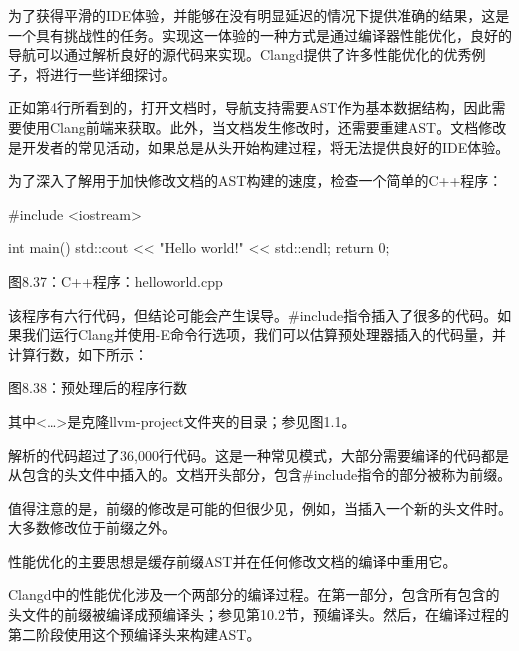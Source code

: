 为了获得平滑的IDE体验，并能够在没有明显延迟的情况下提供准确的结果，这是一个具有挑战性的任务。实现这一体验的一种方式是通过编译器性能优化，良好的导航可以通过解析良好的源代码来实现。Clangd提供了许多性能优化的优秀例子，将进行一些详细探讨。


正如第4行所看到的，打开文档时，导航支持需要AST作为基本数据结构，因此需要使用Clang前端来获取。此外，当文档发生修改时，还需要重建AST。文档修改是开发者的常见活动，如果总是从头开始构建过程，将无法提供良好的IDE体验。


为了深入了解用于加快修改文档的AST构建的速度，检查一个简单的C++程序：

\begin{cpp}
#include <iostream>

int main() {
  std::cout << "Hello world!" << std::endl;
  return 0;
}
\end{cpp}

\begin{center}
图8.37：C++程序：helloworld.cpp
\end{center}

该程序有六行代码，但结论可能会产生误导。\#include指令插入了很多的代码。如果我们运行Clang并使用-E命令行选项，我们可以估算预处理器插入的代码量，并计算行数，如下所示：


\begin{center}
图8.38：预处理后的程序行数
\end{center}

其中<…>是克隆llvm-project文件夹的目录；参见图1.1。

解析的代码超过了36,000行代码。这是一种常见模式，大部分需要编译的代码都是从包含的头文件中插入的。文档开头部分，包含\#include指令的部分被称为前缀。

值得注意的是，前缀的修改是可能的但很少见，例如，当插入一个新的头文件时。大多数修改位于前缀之外。

性能优化的主要思想是缓存前缀AST并在任何修改文档的编译中重用它。


Clangd中的性能优化涉及一个两部分的编译过程。在第一部分，包含所有包含的头文件的前缀被编译成预编译头；参见第10.2节，预编译头。然后，在编译过程的第二阶段使用这个预编译头来构建AST。

